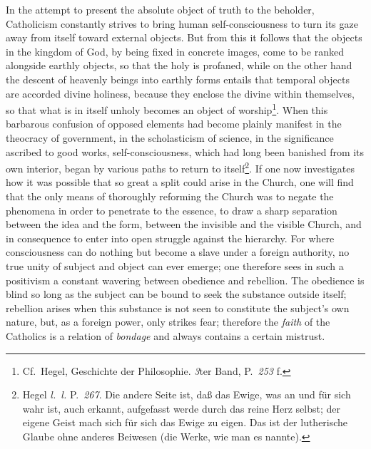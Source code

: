 \documentclass[12pt]{book}
\newcommand{\opage}[1]{\marginnote{\footnotesize\textit{[#1]}}}
\begin{document}
In the attempt to present the absolute object of truth to the beholder,
Catholicism constantly strives to bring human self-consciousness to turn its
gaze away from itself toward external objects. But from this it follows that
the objects in the kingdom of God, by being fixed in concrete images, come to
be ranked alongside earthly objects, so that the holy is profaned, while on the
other hand the descent of heavenly beings into earthly forms entails that
temporal objects are accorded divine holiness, because they enclose the divine
within themselves, so that what is in itself unholy becomes an object of
\opage{61}%
\setcounter{footnote}{0}%
worship\footnote{Cf.\ Hegel, Geschichte der Philosophie. \textit{3}ter
Band, P.~\textit{253} f.}. When this barbarous confusion of opposed elements
had become plainly manifest in the theocracy of government, in the
scholasticism of science, in the significance ascribed to good works,
self-consciousness, which had long been banished from its own interior, began
by various paths to return to itself\footnote{Hegel \textit{l.~l.}
P.~\textit{267}. Die andere Seite ist, daß das Ewige, was an und für sich wahr
ist, auch erkannt, aufgefasst werde durch das reine Herz selbst; der eigene
Geist mach sich für sich das Ewige zu eigen. Das ist der lutherische Glaube ohne
anderes Beiwesen (die Werke, wie man es nannte).}.
If one now investigates how it was possible that so great a split could arise
in the Church, one will find that the only means of thoroughly reforming the
Church was to negate the phenomena in order to penetrate to the essence, to
draw a sharp separation between the idea and the form, between the invisible
and the visible Church, and in consequence to enter into open struggle against
the hierarchy. For where consciousness can do nothing but become a slave under
a foreign authority, no true unity of subject and object can ever emerge; one
therefore sees in such a positivism a constant wavering between obedience and
rebellion. The obedience is blind so long as the subject can be bound to seek
the substance outside itself; rebellion arises when this substance is not seen
to constitute the subject's own nature, but, as a foreign power, only strikes
fear; therefore the \emph{faith} of the Catholics is a relation of
\emph{bondage} and always contains a certain mistrust.
\end{document}
